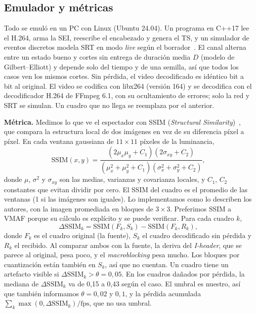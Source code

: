 \documentclass[10pt,twocolumn,letterpaper]{article}
\begin{document}
\subsection{Emulador y métricas}
Todo se emuló en un PC con Linux (Ubuntu 24.04). Un programa en C++17 lee el H.264, arma la SEI, reescribe el encabezado y genera el TS, y un simulador de eventos discretos modela SRT en modo \emph{live} según el borrador~\cite{srt}. El canal alterna entre un estado bueno y cortes sin entrega de duración media $D$ (modelo de Gilbert--Elliott) y depende solo del tiempo y de una semilla, así que todos los casos ven los mismos cortes. Sin pérdida, el video decodificado es idéntico bit a bit al original. El video se codifica con libx264 (versión 164) y se decodifica con el decodificador H.264 de FFmpeg 6.1, con su ocultamiento de errores; solo la red y SRT se simulan. Un cuadro que no llega se reemplaza por el anterior.

\textbf{Métrica.} Medimos lo que ve el espectador con SSIM (\emph{Structural Similarity})~\cite{ssim}, que compara la estructura local de dos imágenes en vez de su diferencia píxel a píxel. En cada ventana gaussiana de $11\times11$ píxeles de la luminancia,
\begin{equation}
\mathrm{SSIM}(x,y)=\frac{(2\mu_x\mu_y+C_1)(2\sigma_{xy}+C_2)}{(\mu_x^2+\mu_y^2+C_1)(\sigma_x^2+\sigma_y^2+C_2)},
\end{equation}
donde $\mu$, $\sigma^2$ y $\sigma_{xy}$ son las medias, varianzas y covarianza locales, y $C_1$, $C_2$ constantes que evitan dividir por cero. El SSIM del cuadro es el promedio de las ventanas (1 si las imágenes son iguales). Lo implementamos como lo describen los autores, con la imagen promediada en bloques de $3\times3$. Preferimos SSIM a VMAF porque su cálculo es explícito y se puede verificar. Para cada cuadro $k$,
\begin{equation}
\Delta\mathrm{SSIM}_k=\mathrm{SSIM}(F_k,S_k)-\mathrm{SSIM}(F_k,R_k),
\label{eq:dssim}
\end{equation}
donde $F_k$ es el cuadro original (la fuente), $S_k$ el cuadro decodificado sin pérdida y $R_k$ el recibido. Al comparar ambos con la fuente, la deriva del \emph{I-header}, que se parece al original, pesa poco, y el \emph{macroblocking} pesa mucho. Los bloques por cuantización están también en $S_k$, así que no cuentan. Un cuadro tiene un artefacto visible si $\Delta\mathrm{SSIM}_k>\theta=0{,}05$. En los cuadros dañados por pérdida, la mediana de $\Delta\mathrm{SSIM}_k$ va de 0,15 a 0,43 según el caso. El umbral es nuestro, así que también informamos $\theta=0{,}02$ y $0{,}1$, y la pérdida acumulada $\sum_k\max(0,\Delta\mathrm{SSIM}_k)/\mathrm{fps}$, que no usa umbral.
\end{document}

